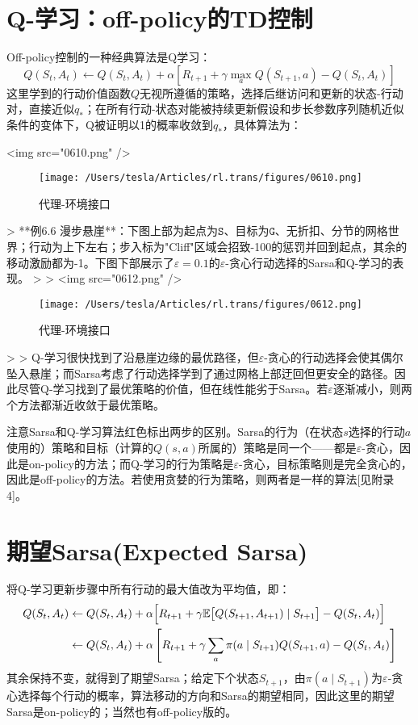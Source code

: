 \documentclass{ctexart}
\begin{document}
\section{Q-学习：off-policy的TD控制}

Off-policy控制的一种经典算法是Q学习：
\begin{equation}
Q(S_t,A_t) \leftarrow Q(S_t,A_t) + \alpha\left[ R_{t+1} + \gamma\max_aQ(S_{t+1},a)-Q(S_t,A_t) \right]
\end{equation}
这里学到的行动价值函数$Q$无视所遵循的策略，选择后继访问和更新的状态-行动对，直接近似$q_*$；在所有行动-状态对能被持续更新假设和步长参数序列随机近似条件的变体下，Q被证明以1的概率收敛到$q_*$，具体算法为：

<img src="0610.png" />
\begin{figure}[htbp]
    \centering
    \texttt{[image: /Users/tesla/Articles/rl.trans/figures/0610.png]}
    \caption{代理-环境接口}
    \label{fig:0610} 
\end{figure}

> **例6.6 漫步悬崖**：下图上部为起点为$\mathtt S$、目标为$\mathtt G$、无折扣、分节的网格世界；行动为上下左右；步入标为"Cliff"区域会招致-100的惩罚并回到起点，其余的移动激励都为-1。下图下部展示了$\varepsilon=0.1$的$\varepsilon$-贪心行动选择的Sarsa和Q-学习的表现。
>
> <img src="0612.png" />
\begin{figure}[htbp]
    \centering
    \texttt{[image: /Users/tesla/Articles/rl.trans/figures/0612.png]}
    \caption{代理-环境接口}
    \label{fig:0612} 
\end{figure}
>
> Q-学习很快找到了沿悬崖边缘的最优路径，但$\varepsilon$-贪心的行动选择会使其偶尔坠入悬崖；而Sarsa考虑了行动选择学到了通过网格上部迂回但更安全的路径。因此尽管Q-学习找到了最优策略的价值，但在线性能劣于Sarsa。若$\varepsilon$逐渐减小，则两个方法都渐近收敛于最优策略。

注意Sarsa和Q-学习算法红色标出两步的区别。Sarsa的行为（在状态$s$选择的行动$a$使用的）策略和目标（计算的$Q(s,a)$所属的）策略是同一个——都是$\varepsilon$-贪心，因此是on-policy的方法；而Q-学习的行为策略是$\varepsilon$-贪心，目标策略则是完全贪心的，因此是off-policy的方法。若使用贪婪的行为策略，则两者是一样的算法[见附录4]。



\section{期望Sarsa(Expected Sarsa)}

将Q-学习更新步骤中所有行动的最大值改为平均值，即：
\begin{align*}
Q(S_t,A_t) &\leftarrow Q(S_t,A_t) + \alpha\Bigl[ R_{t+1} + \gamma\mathbb E\bigl[Q(S_{t+1},A_{t+1})\mid S_{t+1}\bigr] - Q(S_t,A_t)\Bigr]\\
&\leftarrow Q(S_t,A_t) + \alpha\left[ R_{t+1} + \gamma\sum_a\pi(a\mid S_{t+1})Q(S_{t+1},a) - Q(S_t,A_t) \right]
\end{align*}
其余保持不变，就得到了期望Sarsa；给定下个状态$S_{t+1}$，由$\pi(a\mid S_{t+1})$为$\varepsilon$-贪心选择每个行动的概率，算法移动的方向和Sarsa的期望相同，因此这里的期望Sarsa是on-policy的；当然也有off-policy版的。
\end{document}
